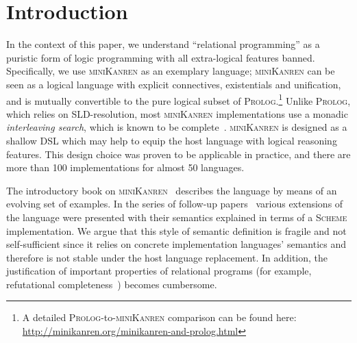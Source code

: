 \section{Introduction}

In the context of this paper, we understand ``relational programming'' as a puristic form of logic programming with all extra-logical
features banned. Specifically, we use \textsc{miniKanren} as an exemplary language; \textsc{miniKanren} can be seen as
a logical language with explicit connectives, existentials and unification, and is mutually convertible to the pure logical subset of
\textsc{Prolog}.\footnote{A detailed \textsc{Prolog}-to-\textsc{miniKanren} comparison can be found here: \url{http://minikanren.org/minikanren-and-prolog.html}}
Unlike \textsc{Prolog}, which relies on SLD-resolution, most \textsc{miniKanren} implementations use a monadic \emph{interleaving
search}, which is known to be complete~\cite{2016}.
\textsc{miniKanren} is designed as a shallow DSL which may help to equip the host language with logical reasoning features. This
design choice was proven to be applicable in practice, and there are more than 100 implementations for almost 50 languages.

The introductory book on \textsc{miniKanren}~\cite{TRS} describes the language by means of an evolving set of examples. In the
series of follow-up papers~\cite{MicroKanren,CKanren,CKanren1,AlphaKanren,2016,Guided} various extensions of the language were presented with
their semantics explained in terms of a \textsc{Scheme} implementation. We argue that this style of semantic definition is
fragile and not self-sufficient since it relies on concrete implementation languages' semantics and therefore is not stable under the host language replacement.
In addition, the justification of important properties of relational programs (for example, refutational completeness~\cite{WillThesis}) becomes cumbersome.

\begin{comment}
There were some previous attempts to define a formal semantics for \textsc{miniKanren}. In~\cite{MechanisingMiniKanren} formal definitions
for denotational and non-deterministic operational semantics were given and the soundness result was proven; the development was mechanized in HOL. 
\cite{RelConversion} presented a variant of nondeterministic operational semantics, and~\cite{DivTest} used another variant of finite-set semantics.
None of the previous approaches were capable of reflecting the distinctive property of \textsc{miniKanren}'s search~--- \emph{interleaving}~\cite{Search},
thus deviating from the conventional understanding of the language.
\end{comment}

